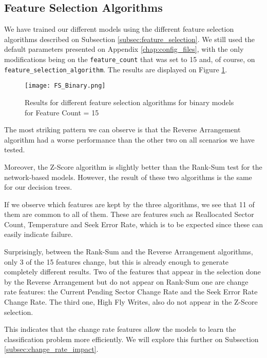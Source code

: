 \subsection{Feature Selection Algorithms}

We have trained our different models using the different feature selection algorithms described on Subsection \ref{subsec:feature_selection}.
We still used the default parameters presented on Appendix \ref{chap:config_files}, with the only modifications being on the \verb|feature_count| that was set to 15 and, of course, on \verb|feature_selection_algorithm|.
The results are displayed on Figure \ref{fig:fs_binary}.

\begin{figure}
\begin{center}
  \texttt{[image: FS\_Binary.png]}
  \caption[Feature Selection Results]{Results for different feature selection algorithms for binary models for Feature Count = 15}
  \label{fig:fs_binary}
\end{center}
\end{figure}

The most striking pattern we can observe is that the Reverse Arrangement algorithm had a worse performance than the other two on all scenarios we have tested.

Moreover, the Z-Score algorithm is slightly better than the Rank-Sum test for the network-based models.
However, the result of these two algorithms is the same for our decision trees.

If we observe which features are kept by the three algorithms, we see that 11 of them are common to all of them.
These are features such as Reallocated Sector Count, Temperature and Seek Error Rate, which is to be expected since these can easily indicate failure.

Surprisingly, between the Rank-Sum and the Reverse Arrangement algorithms, only 3 of the 15 features change, but this is already enough to generate completely different results.
Two of the features that appear in the selection done by the Reverse Arrangement but do not appear on Rank-Sum one are change rate features: the Current Pending Sector Change Rate and the Seek Error Rate Change Rate.
The third one, High Fly Writes, also do not appear in the Z-Score selection.

This indicates that the change rate features allow the models to learn the classification problem more efficiently.
We will explore this further on Subsection \ref{subsec:change_rate_impact}.

